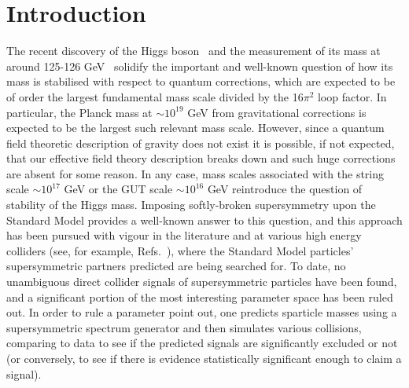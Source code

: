 \documentclass[final,3p,times,pdflatex]{elsarticle}
\begin{document}
\section{Introduction}

The recent discovery of the Higgs boson~\cite{Aad:2012tfa,Chatrchyan:2012ufa}
and the measurement of its mass at around 
125-126 GeV~\cite{ATLAS-CONF-2013-014} solidify the important and well-known
question of how its mass is 
stabilised with respect to quantum corrections, which are expected to be of
order the largest fundamental mass scale divided by the 16$\pi^2$ loop factor.
In particular, the Planck mass at $\sim 10^{19}$ GeV from gravitational
corrections is expected to be the largest such relevant mass scale. 
However, since a quantum field theoretic description of gravity does not
exist it is possible, if not expected, that our effective field theory
description breaks down and such huge corrections are absent
for some reason. 
In any case, mass scales associated with the string scale $\sim 10^{17}$ GeV
or the GUT scale $\sim 10^{16}$ GeV reintroduce the question of stability of
the Higgs mass.  
Imposing softly-broken supersymmetry upon the Standard Model provides a
well-known answer to this question, and this approach has been pursued
with vigour in the literature and at various high energy colliders (see, for
example, Refs.~\cite{Aad:2013wta,Chatrchyan:2014lfa}), where 
the Standard Model particles' supersymmetric partners predicted are being
searched for. To date, no unambiguous direct collider signals of
supersymmetric particles have been found, and a significant portion of the
most interesting parameter space has been ruled out. 
In order to rule a parameter point out, one predicts sparticle masses using
a supersymmetric spectrum generator and then simulates various collisions,
comparing to data to see if the predicted signals are significantly excluded
or not (or conversely, to see if there is evidence statistically significant
enough to claim a signal).
\end{document}
